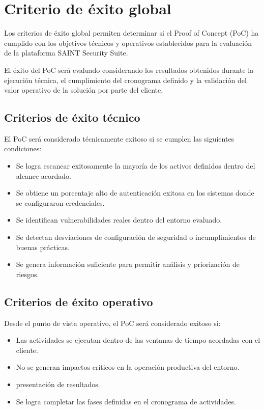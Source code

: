\documentclass[a4paper]{article}
\begin{document}
    \section{Criterio de éxito global}
    Los criterios de éxito global permiten determinar si el Proof of Concept (PoC) ha cumplido con los objetivos técnicos y operativos establecidos para la evaluación de la plataforma SAINT Security Suite.

    El éxito del PoC será evaluado considerando los resultados obtenidos durante la ejecución técnica, el cumplimiento del cronograma definido y la validación del valor operativo de la solución por parte del cliente.
    \subsection{Criterios de éxito técnico}
    El PoC será considerado técnicamente exitoso si se cumplen las siguientes condiciones:\\
    \begin{itemize}
        \item Se logra escanear exitosamente la mayoría de los activos definidos dentro del alcance acordado.
        \item Se obtiene un porcentaje alto de autenticación exitosa en los sistemas donde se configuraron credenciales.
        \item Se identifican vulnerabilidades reales dentro del entorno evaluado.
        \item Se detectan desviaciones de configuración de seguridad o incumplimientos de buenas prácticas.
        \item Se genera información suficiente para permitir análisis y priorización de riesgos.
    \end{itemize}

    \subsection{Criterios de éxito operativo}
    Desde el punto de vista operativo, el PoC será considerado exitoso si:\\
    \begin{itemize}
        \item Las actividades se ejecutan dentro de las ventanas de tiempo acordadas con el cliente.
        \item No se generan impactos críticos en la operación productiva del entorno.
        \item presentación de resultados.
        \item Se logra completar las fases definidas en el cronograma de actividades.
    \end{itemize}
    
\end{document}
